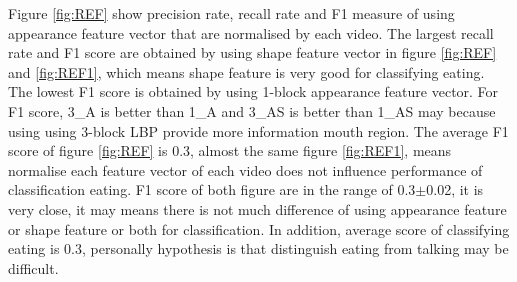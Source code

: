 \newline
Figure \ref{fig:REF} show precision rate, recall rate and F1 measure of using appearance feature vector that are normalised by each video. The largest recall rate and F1 score are obtained by using shape feature vector in figure \ref{fig:REF} and \ref{fig:REF1}, which means shape feature is very good for classifying eating. The lowest F1 score is obtained by using 1-block appearance feature vector. For F1 score, 3\_A is better than 1\_A and 3\_AS is better than 1\_AS may because using using 3-block LBP provide more information mouth region. The average F1 score of figure \ref{fig:REF} is 0.3, almost the same figure \ref{fig:REF1}, means normalise each feature vector of each video does not influence performance of classification eating. F1 score of both figure are in the range of 0.3$\pm$0.02, it is very close, it may means there is not much difference of using appearance feature or shape feature or both for classification. In addition,  average score of classifying eating is 0.3, personally hypothesis is that distinguish eating from talking may be difficult. 
